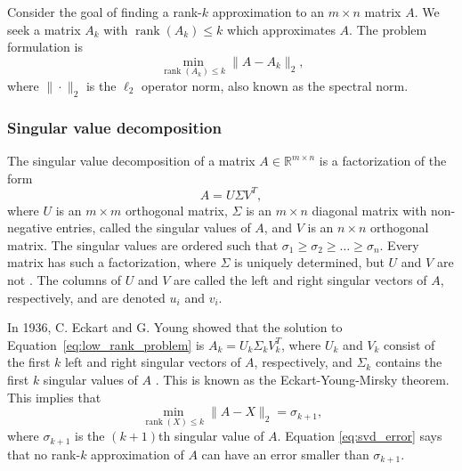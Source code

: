 Consider the goal of finding a rank-$k$ approximation to an $m \times n$ matrix $A$. We seek a matrix $A_k$ with $\operatorname{rank}(A_k) \le k$ which approximates $A$. The problem formulation is
\begin{equation}\label{eq:low_rank_problem}
    \min_{\operatorname{rank}(A_k)\le k} \|A - A_k \|_2,
\end{equation}
where $\| \cdot \|_2$ is the $\ell_2$ operator norm, also known as the spectral norm.


\subsubsection{Singular value decomposition}
The singular value decomposition of a matrix $A\in\mathbb R^{m\times n}$ is a factorization of the form
\begin{equation*}
    A = U\Sigma V^T,
\end{equation*}
where $U$ is an $m \times m$ orthogonal matrix, $\Sigma$ is an $m\times n$ diagonal matrix with non-negative entries, called the singular values of $A$, and $V$ is an $n \times n$ orthogonal matrix. The singular values are ordered such that $\sigma_1\ge\sigma_2\ge\dots\ge\sigma_n$. Every matrix has such a factorization, where $\Sigma$ is uniquely determined, but $U$ and $V$ are not \cite{layLinearAlgebraIts2022}. The columns of $U$ and $V$ are called the left and right singular vectors of $A$, respectively, and are denoted $u_i$ and $v_i$.
%
%
%
%
%
%

In 1936, C. Eckart and G. Young showed that the solution to Equation~\eqref{eq:low_rank_problem} is $A_k = U_k\Sigma_k V_k^T$, where $U_k$ and $V_k$ consist of the first $k$ left and right singular vectors of $A$, respectively, and $\Sigma_k$ contains the first $k$ singular values of $A$ \cite{eckartApproximationOneMatrix1936}. This is known as the Eckart-Young-Mirsky theorem. This implies that
\begin{equation}\label{eq:svd_error}
    \min_{\operatorname{rank}(X)\le k} \|A - X \|_2 = \sigma_{k+1},
\end{equation}
where $\sigma_{k+1}$ is the $(k+1)$th singular value of $A$. Equation \eqref{eq:svd_error} says that no rank-$k$ approximation of $A$ can have an error smaller than $\sigma_{k+1}$.


